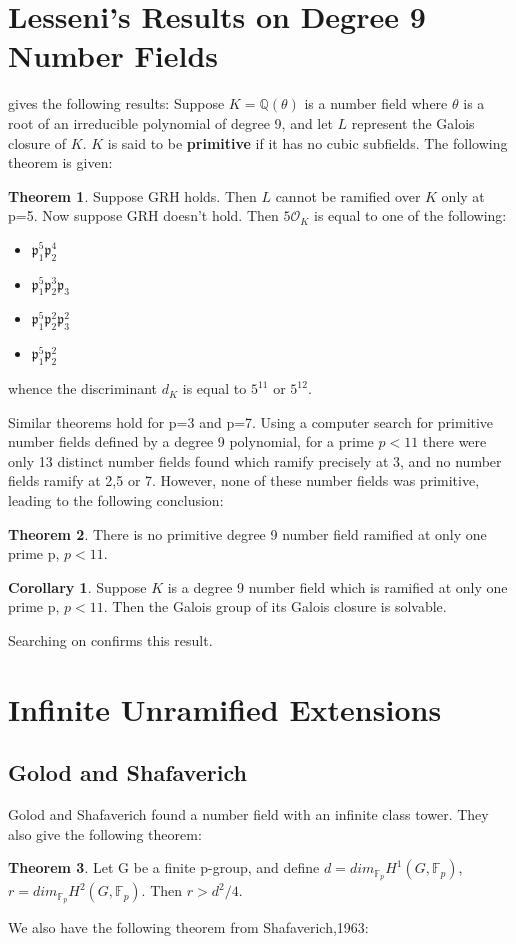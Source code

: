 \documentclass[12pt]{extarticle}
\newcommand{\<}{\langle}
\renewcommand{\>}{\rangle}
\theoremstyle{definition}
\newtheorem{theorem}{Theorem}
\newtheorem{corollary}{Corollary}
\begin{document}
\section{Lesseni's Results on Degree 9 Number Fields}
\cite{LESSENI} gives the following results:
Suppose $K=\mathbb{Q}(\theta)$ is a number field where $\theta$ is a root of an irreducible polynomial of degree 9, and let $L$ represent the Galois closure of $K$. $K$ is said to be \textbf{primitive} if it has no cubic subfields. The following theorem is given:
 \begin{theorem}
    Suppose GRH holds. Then $L$ cannot be ramified over $K$ only at p=5. Now suppose GRH doesn't hold. Then $5\mathcal{O}_K$ is equal to one of the following: \begin{itemize}
        \item $\mathfrak{p}_1^5\mathfrak{p}_2^4$
        \item $\mathfrak{p}_1^5\mathfrak{p}_2^3\mathfrak{p}_3$
        \item $\mathfrak{p}_1^5\mathfrak{p}_2^2\mathfrak{p}_3^2$
        \item  $\mathfrak{p}_1^5\mathfrak{p}_2^2$
    \end{itemize}
    whence the discriminant $d_K$ is equal to $5^{11}$ or $5^{12}$. 
\end{theorem}
Similar theorems hold for p=3 and p=7.  Using a computer search for primitive number fields defined by a degree 9 polynomial, for a prime $p<11$ there were only 13 distinct number fields found which ramify precisely at 3, and no number fields ramify at 2,5 or 7. However, none of these number fields was primitive, leading to the following conclusion:
\begin{theorem}
    There is no primitive degree 9 number field ramified at only one prime p, $p<11$.
\end{theorem}
\begin{corollary}
 Suppose $K$ is a degree 9 number field which is ramified at only one prime p, $p<11$. Then the Galois group of its Galois closure is solvable. 
\end{corollary}
Searching on \cite{JONE2} confirms this result. 

\section{Infinite Unramified Extensions}

\subsection{Golod and Shafaverich}
Golod and Shafaverich \cite{GOLO} found a number field with an infinite class tower. They also give the following theorem:\begin{theorem}
    Let G be a finite p-group, and define $d=dim_{\mathbb{F}_{p}}H^1(G,\mathbb{F}_p)$, $r=dim_{\mathbb{F}_{p}}H^2(G,\mathbb{F}_p)$. 
    Then $r>d^2/4$.
\end{theorem}
We also have the following theorem from Shafaverich,1963:
\end{document}
